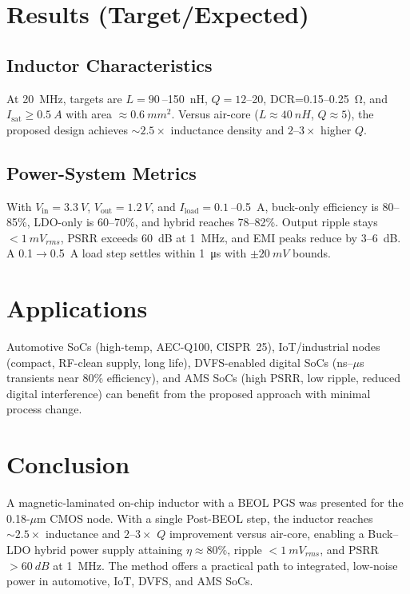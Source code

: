\documentclass[journal]{IEEEtran}
\begin{document}
\section{Results (Target/Expected)}
\subsection{Inductor Characteristics}
At \SI{20}{MHz}, targets are $L=\SI{90}{}$--\SI{150}{nH}, $Q=12$--20, DCR=\SI{0.15}{}--\SI{0.25}{\ohm}, and $I_\mathrm{sat}\ge\SI{0.5}{A}$ with area $\approx\SI{0.6}{mm^2}$. Versus air-core ($L\!\approx\!\SI{40}{nH}$, $Q\!\approx\!5$), the proposed design achieves $\sim\!2.5\times$ inductance density and $2$--$3\times$ higher $Q$.

\subsection{Power-System Metrics}
With $V_\mathrm{in}=\SI{3.3}{V}$, $V_\mathrm{out}=\SI{1.2}{V}$, and $I_\mathrm{load}=\SI{0.1}{}$--\SI{0.5}{A}, buck-only efficiency is 80--85\%, LDO-only is 60--70\%, and hybrid reaches 78--82\%. Output ripple stays $<\SI{1}{mV_{rms}}$, PSRR exceeds \SI{60}{dB} at \SI{1}{MHz}, and EMI peaks reduce by \SI{3}{}--\SI{6}{dB}. A \SI{0.1}{}\(\rightarrow\)\SI{0.5}{A} load step settles within \SI{1}{\micro s} with $\pm\SI{20}{mV}$ bounds.

\section{Applications}
Automotive SoCs (high-temp, AEC-Q100, CISPR~25), IoT/industrial nodes (compact, RF-clean supply, long life), DVFS-enabled digital SoCs (ns--\(\mu\)s transients near 80\% efficiency), and AMS SoCs (high PSRR, low ripple, reduced digital interference) can benefit from the proposed approach with minimal process change.

\section{Conclusion}
A magnetic-laminated on-chip inductor with a BEOL PGS was presented for the 0.18-\mbox{$\mu$m} CMOS node. With a single Post-BEOL step, the inductor reaches $\sim\!2.5\times$ inductance and $2$--$3\times$ $Q$ improvement versus air-core, enabling a Buck--LDO hybrid power supply attaining $\eta\approx80\%$, ripple $<\SI{1}{mV_{rms}}$, and PSRR $>\SI{60}{dB}$ at \SI{1}{MHz}. The method offers a practical path to integrated, low-noise power in automotive, IoT, DVFS, and AMS SoCs.
\end{document}
